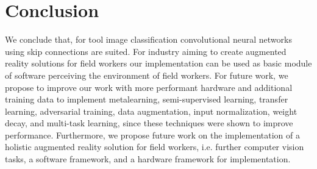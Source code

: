 \documentclass[a4paper, 10pt, journal]{wissarbIEEE}
\begin{document}
\section{Conclusion}
\label{sec:conclusion}
We conclude that, for tool image classification convolutional neural networks using skip connections are suited. For industry aiming to create augmented reality solutions for field workers our implementation can be used as basic module of software perceiving the environment of field workers. 
For future work, we propose to improve our work with more performant hardware and additional training data to implement metalearning, semi-supervised learning, transfer learning, adversarial training, data augmentation, input normalization, weight decay, and multi-task learning, since these techniques were shown to improve performance. \cite{Pan.2010, Szegedy.2014, ElAmir.2020} 
Furthermore, we propose future work on the implementation of a holistic augmented reality solution for field workers, i.e. further computer vision tasks, a software framework, and a hardware framework for implementation.

\end{document}
